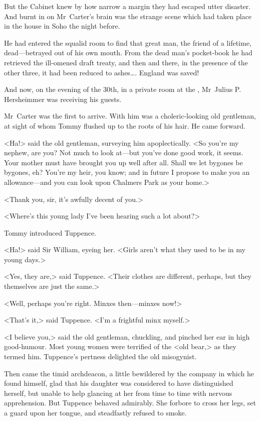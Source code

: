 But the Cabinet knew by how narrow a margin they had escaped utter disaster. And burnt in on Mr~Carter's brain was the strange scene which had taken place in the house in Soho the night before.

He had entered the squalid room to find that great man, the friend of a lifetime, dead—betrayed out of his own mouth. From the dead man's pocket-book he had retrieved the ill-omened draft treaty, and then and there, in the presence of the other three, it had been reduced to ashes\dots. England was saved!

And now, on the evening of the 30th, in a private room at the , Mr~Julius P. Hersheimmer was receiving his guests.

Mr~Carter was the first to arrive. With him was a choleric-looking old gentleman, at sight of whom Tommy flushed up to the roots of his hair. He came forward.

<Ha!> said the old gentleman, surveying him apoplectically. <So you're my nephew, are you? Not much to look at—but you've done good work, it seems. Your mother must have brought you up well after all. Shall we let bygones be bygones, eh? You're my heir, you know; and in future I propose to make you an allowance—and you can look upon Chalmers Park as your home.>

<Thank you, sir, it's awfully decent of you.>

<Where's this young lady I've been hearing such a lot about?>

Tommy introduced Tuppence.

<Ha!> said Sir William, eyeing her. <Girls aren't what they used to be in my young days.>

<Yes, they are,> said Tuppence. <Their clothes are different, perhaps, but they themselves are just the same.>

<Well, perhaps you're right. Minxes then—minxes now!>

<That's it,> said Tuppence. <I'm a frightful minx myself.>

<I believe you,> said the old gentleman, chuckling, and pinched her ear in high good-humour. Most young women were terrified of the <old bear,> as they termed him. Tuppence's pertness delighted the old misogynist.

Then came the timid archdeacon, a little bewildered by the company in which he found himself, glad that his daughter was considered to have distinguished herself, but unable to help glancing at her from time to time with nervous apprehension. But Tuppence behaved admirably. She forbore to cross her legs, set a guard upon her tongue, and steadfastly refused to smoke.

